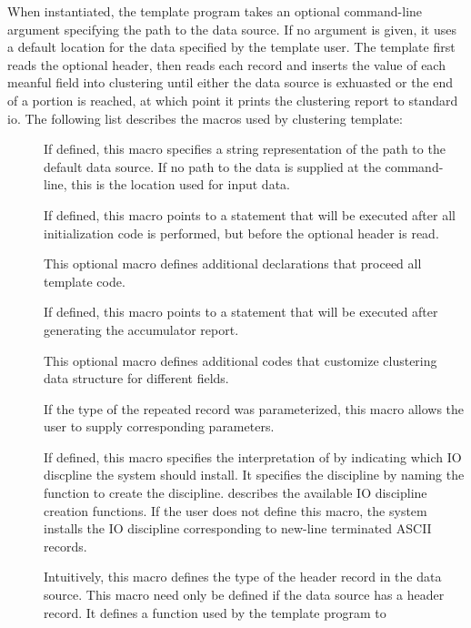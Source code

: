 When instantiated, the template program takes an optional command-line
argument specifying the path to the data source. If no argument is
given, it uses a default location for the data specified by the
template user. The template first reads the optional header, then
reads each record and inserts the value of each meanful field into
clustering until either the data source is exhuasted or the end of a
portion is reached, at which point it prints the clustering report to
standard io. The following list describes the macros used by
clustering template:

\begin{description}

\item[] If defined, this macro specifies a string
  representation of the path to the default data source. If no path to
  the data is supplied at the command-line, this is the location used
  for input data. 
\item[] If defined, this macro points to a \C{}
  statement that will be executed after all initialization code is
  performed, but before the optional header is read.
\item[] This optional macro defines additional \C{}
  declarations that proceed all template code.
\item[] If defined, this macro points to a \C{}
  statement that will be executed after generating the accumulator report.
\item[] This optional macro defines additional \C{}
  codes that customize clustering data structure for different fields.
\item[] If the type of the repeated record was
  parameterized, this macro allows the user to supply corresponding
  parameters. 
\item[] If defined, this macro specifies the
  interpretation of \Precord{} by indicating which IO discpline the
  system should install. It specifies the discipline by naming the
  function to create the discipline. 
  describes the available IO discipline creation functions.  If the
  user does not define this macro, the system installs the IO
  discipline corresponding to  new-line terminated ASCII records.
\item[] Intuitively, this macro defines the type of
  the header record in the data source. This macro need only be
  defined if the data source has a header record. It defines a function used by the template program to

\end{description}
